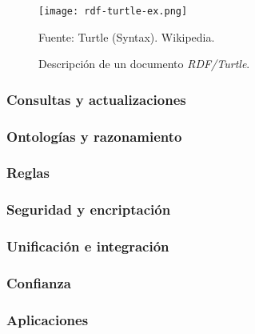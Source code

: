 \begin{figure}
    \label{fig:rdf-turtle-ex}
    \centering
    \texttt{[image: rdf-turtle-ex.png]}
    \caption{Descripción de un documento \textit{RDF/Turtle}.} Fuente: Turtle
    (Syntax). Wikipedia.
\end{figure}

\subsubsection{Consultas y actualizaciones}

\subsubsection{Ontologías y razonamiento}

\subsubsection{Reglas}

\subsubsection{Seguridad y encriptación}

\subsubsection{Unificación e integración}

\subsubsection{Confianza}

\subsubsection{Aplicaciones}